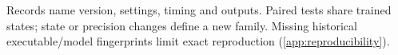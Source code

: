 Records name version, settings, timing and outputs. Paired tests share trained states; state or precision changes define a new family. Missing historical executable/model fingerprints limit exact reproduction (\cref{app:reproducibility}).